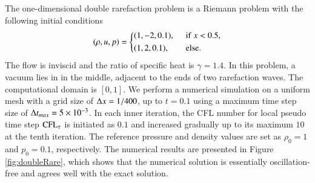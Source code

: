 The one-dimensional double rarefaction problem \cite{hu2004kineticDoubleRare}
is a Riemann problem with the following initial conditions
\begin{equation}
    (\rho,u,p) = \begin{dcases}
        (1,-2,0.1),\ \  & \mathrm{if} \ x < 0.5,       \\
        (1,2,0.1),\ \   & \mathrm{else}.
    \end{dcases}
\end{equation}
The flow is inviscid and the ratio of specific heat is $\gamma=1.4$.
In this problem, a vacuum lies in in the middle, adjacent to the ends of two rarefaction waves.
The computational domain is $[0,1]$.
We perform a numerical simulation on a uniform mesh with a grid size of $\mathrm\Delta x = 1/400$, up to $t=0.1$
 using a maximum time step size of $\mathrm\Delta t_{max}= 5 \times 10 ^{-3}$.
In each inner iteration, the CFL number for local pseudo time step $\text{CFL}_\tau$ is initiated as $0.1$ and
increased gradually up to its maximum $10$ at the tenth iteration.
The reference pressure and density values are set as $\rho_0=1$ and $p_0=0.1$, respectively.
The numerical results are presented in Figure \ref{fig:doubleRare}, which shows that the numerical solution is essentially oscillation-free and agrees well with the exact solution.

